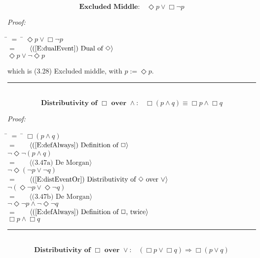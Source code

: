 \documentclass[fleqn, leqno]{article}
\newcommand{\lgap}{2pt}                             %
\newcommand{\mymathindent}{24pt}                    %
\newcommand{\Event}{\Diamond}
\newcommand{\Always}{\Box}
\newcommand{\myqed}{\hfill\rule[-.23ex]{1.2ex}{2.0ex}}
\newcommand{\Gll} {\langle}                         %
\newcommand{\Ggg} {\rangle}                         %
\newcommand{\Hint}[1]     {\ \ \ $\Gll              \mbox{#1} \Ggg$ }   %
\begin{document}
\begin{equation}\label{E:excludedMid}
\textbf{Excluded Middle:}\quad \Event p \lor \Always\lnot p
\end{equation}

\emph{Proof:}
\begin{tabbing}
\hspace{\mymathindent} \= $= \;$ \= \kill
  \> \>   $\Event p \lor \Always\lnot p$\\[\lgap]
  \> $=$  \>  \Hint{(\ref{E:dualEvent}) Dual of $\Event$}\\[\lgap]
  \> \>   $\Event p \lor \lnot\Event p$\\[\lgap]
\end{tabbing}
which is (3.28) Excluded middle, with $p := \Event p$. \myqed\\[\lgap]


\begin{equation}\label{E:distAlwaysAnd}
\textbf{Distributivity of $\Always$ over $\land$:}\quad \Always (p \land q) \equiv \Always p \land \Always q
\end{equation}

\emph{Proof:}
\begin{tabbing}
\hspace{\mymathindent} \= $= \;$ \= \kill
  \> \>   $\Always (p \land q)$\\[\lgap]
  \> $=$  \>  \Hint{(\ref{E:defAlways}) Definition of $\Always$}\\[\lgap]
  \> \>   $\lnot\Event\lnot (p \land q)$\\[\lgap]
  \> $=$  \>  \Hint{(3.47a) De Morgan}\\[\lgap]
  \> \>   $\lnot\Event (\lnot p \lor \lnot q)$\\[\lgap]
  \> $=$  \>  \Hint{(\ref{E:distEventOr}) Distributivity of $\Event$ over $\lor$}\\[\lgap]
  \> \>   $\lnot (\Event\lnot p \lor \Event\lnot q)$\\[\lgap]
  \> $=$  \>  \Hint{(3.47b) De Morgan}\\[\lgap]
  \> \>   $\lnot\Event\lnot p \land \lnot\Event\lnot q$\\[\lgap]
  \> $=$  \>  \Hint{(\ref{E:defAlways}) Definition of $\Always$, twice}\\[\lgap]
  \> \>   $\Always p \land \Always q$
\end{tabbing}
\myqed\\[\lgap]


\begin{equation}\label{E:distAlwaysOr}
\textbf{Distributivity of $\Always$ over $\lor$:}\quad (\Always p \lor \Always q) \Rightarrow \Always (p \lor q)
\end{equation}
\end{document}
